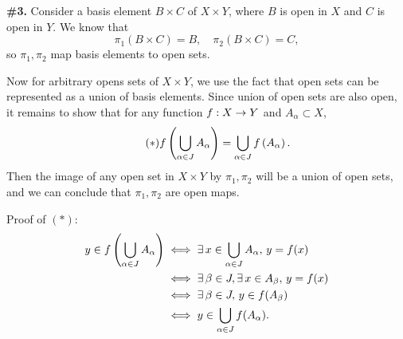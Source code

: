 \documentclass[a4paper,11pt]{article}
\begin{document}
\newpage

\phantom{?}
\vspace{5mm}

\begin{minipage}[t][270mm]{90mm}
    {\bfseries \large \#3.} Consider a basis element \(B \times C\) of \(X \times Y\), where \(B\) is open in \(X\) and \(C\) is open in \(Y\). We know that
    \[
        \pi_1(B\times C) = B, \quad \pi_2(B\times C) = C,
    \]
    so \(\pi_1, \pi_2\) map basis elements to open sets.

    \bigskip

    Now for arbitrary opens sets of \(X \times Y\), we use the fact that open sets can be represented as a union of basis elements. Since union of open sets are also open, it remains to show that for any function \(f : X \rightarrow Y\) and \(A_\alpha \subset X\),
    \[\tag{\(\ast\)}
        f\left( \bigcup_{\alpha \in J} A_\alpha \right) = \bigcup_{\alpha \in J} f\left( A_\alpha \right).
    \]
    Then the image of any open set in \(X \times Y\) by \(\pi_1, \pi_2\) will be a union of open sets, and we can conclude that \(\pi_1, \pi_2\) are open maps.

    \bigskip

    Proof of \((\ast)\):
    \[
        \begin{aligned}
            y \in f\paren{\bigcup_{\alpha \in J} A_\alpha} & \iff \exists x \in \bigcup_{\alpha \in J} A_\alpha,\, y = f(x) \\
                                                           & \iff \exists \beta\in J, \exists x \in A_\beta, \, y = f(x)    \\
                                                           & \iff \exists \beta \in J,\,  y \in f(A_\beta)                  \\
                                                           & \iff y \in \bigcup_{\alpha \in J} f(A_\alpha).
        \end{aligned}
    \]
\end{minipage}
{\color{gray}\vline}
\begin{minipage}[t][270mm]{90mm}
    \phantom{?}
\end{minipage}

\newpage

\phantom{?}
\vspace{5mm}
\end{document}
